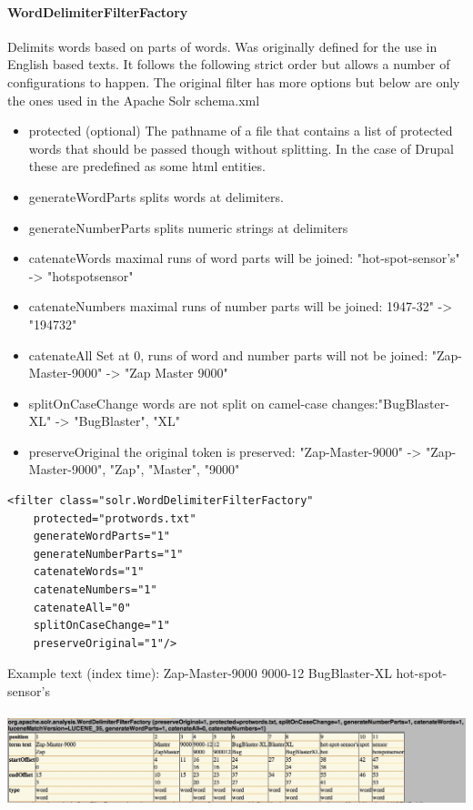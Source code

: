 \paragraph{WordDelimiterFilterFactory} Delimits words based on parts of words. Was originally defined for the use in English based texts. It follows the following strict order but allows a number of configurations to happen. The original filter has more options but below are only the ones used in the Apache Solr schema.xml
\begin{itemize}
\item{protected} (optional) The pathname of a file that contains a list of protected words that should be passed though without splitting. In the case of Drupal these are predefined as some html entities.
\item{generateWordParts} splits words at delimiters. 
\item{generateNumberParts}  splits numeric strings at delimiters
\item{catenateWords} maximal runs of word parts will be joined: "hot-spot-sensor's" -> "hotspotsensor"
\item{catenateNumbers} maximal runs of number parts will be joined: 1947-32" -> "194732"
\item{catenateAll} Set at 0, runs of word and number parts will not be joined: "Zap-Master-9000" -> "Zap Master 9000"
\item{splitOnCaseChange} words are not split on camel-case changes:"BugBlaster-XL" -> "BugBlaster", "XL"
\item{preserveOriginal} the original token is preserved: "Zap-Master-9000" -> "Zap-Master-9000", "Zap", "Master", "9000"
\end{itemize}
\begin{verbatim}
<filter class="solr.WordDelimiterFilterFactory"
    protected="protwords.txt"
    generateWordParts="1"
    generateNumberParts="1"
    catenateWords="1"
    catenateNumbers="1"
    catenateAll="0"
    splitOnCaseChange="1"
    preserveOriginal="1"/>
\end{verbatim}
Example text (index time): Zap-Master-9000 9000-12 BugBlaster-XL hot-spot-sensor's
\mbox{} \\
\mbox{} \\
\includegraphics[width=\textwidth]{images/worddelimiterfactory.jpg}

